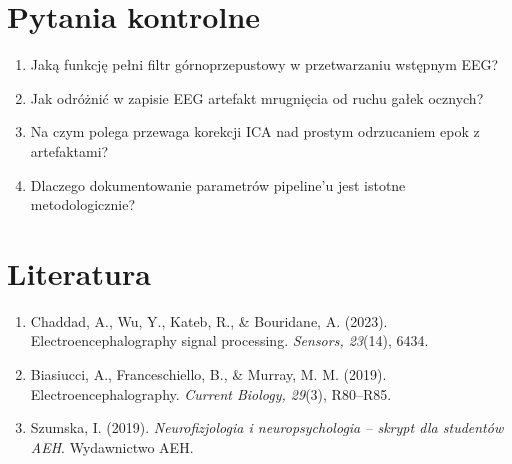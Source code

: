 \documentclass[11pt,a4paper]{article}
\begin{document}
\section{Pytania kontrolne}
\begin{enumerate}[nosep]
  \item Jaką funkcję pełni filtr górnoprzepustowy w przetwarzaniu wstępnym EEG?
  \item Jak odróżnić w zapisie EEG artefakt mrugnięcia od ruchu gałek ocznych?
  \item Na czym polega przewaga korekcji ICA nad prostym odrzucaniem epok z artefaktami?
  \item Dlaczego dokumentowanie parametrów pipeline'u jest istotne metodologicznie?
\end{enumerate}

\section{Literatura}
\begin{enumerate}[nosep]
  \item Chaddad, A., Wu, Y., Kateb, R., \& Bouridane, A. (2023). Electroencephalography signal processing. \emph{Sensors, 23}(14), 6434.
  \item Biasiucci, A., Franceschiello, B., \& Murray, M. M. (2019). Electroencephalography. \emph{Current Biology, 29}(3), R80--R85.
  \item Szumska, I. (2019). \emph{Neurofizjologia i neuropsychologia -- skrypt dla studentów AEH}. Wydawnictwo AEH.
\end{enumerate}
\end{document}
